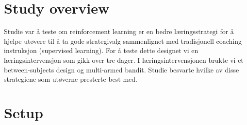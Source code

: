 \section{Study overview}
\newcommand{\RNum}[1]{\uppercase\expandafter{\romannumeral #1\relax}}
Studie \RNum{1} var å teste om reinforcement learning er en bedre læringsstrategi for å hjelpe utøvere til å ta gode strategivalg sammenlignet med tradisjonell coaching instruksjon (supervised learning). For å teste dette designet vi en læringsintervensjon som gikk over tre dager. I læringsintervensjonen brukte vi et between-subjects design og multi-armed bandit.  Studie \RNum{2} besvarte hvilke av disse strategiene som utøverne presterte best med. 


\section{Setup}

